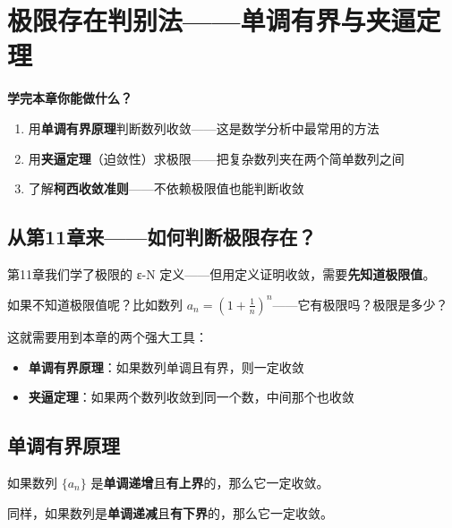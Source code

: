 
\chapter{极限存在判别法——单调有界与夹逼定理}

\begin{applicationbox}
\textbf{学完本章你能做什么？}
\begin{enumerate}
  \item 用\textbf{单调有界原理}判断数列收敛——这是数学分析中最常用的方法
  \item 用\textbf{夹逼定理}（迫敛性）求极限——把复杂数列夹在两个简单数列之间
  \item 了解\textbf{柯西收敛准则}——不依赖极限值也能判断收敛
\end{enumerate}
\end{applicationbox}


\section{从第11章来——如何判断极限存在？}

第11章我们学了极限的 ε-N 定义——但用定义证明收敛，需要\textbf{先知道极限值}。

如果不知道极限值呢？比如数列 \(a_n = (1 + \frac{1}{n})^n\)——它有极限吗？极限是多少？

这就需要用到本章的两个强大工具：
\begin{itemize}
  \item \textbf{单调有界原理}：如果数列单调且有界，则一定收敛
  \item \textbf{夹逼定理}：如果两个数列收敛到同一个数，中间那个也收敛
\end{itemize}


\section{单调有界原理}

\begin{theorembox}[单调有界原理]
如果数列 \(\{a_n\}\) 是\textbf{单调递增}且\textbf{有上界}的，那么它一定收敛。

同样，如果数列是\textbf{单调递减}且\textbf{有下界}的，那么它一定收敛。
\end{theorembox}

